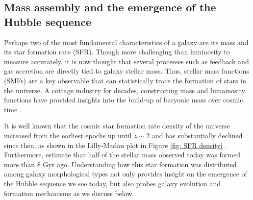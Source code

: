 \subsection{Mass assembly and the emergence of the Hubble sequence}
\label{chap1: mass assembly}

Perhaps two of the most fundamental characteristics of a galaxy are its mass and its star formation rate (SFR). Though more challenging than luminosity to measure accurately, it is now thought that several processes such as feedback \citep[e.g.,][]{Gabor2010} and gas accretion \citep[e.g.,][]{Conselice2013} are directly tied to galaxy stellar mass. Thus, stellar mass functions (SMFs) are a key observable that can statistically trace the formation of stars in the universe.  A cottage industry for decades, constructing mass and lumainosity functions have provided insights into the build-up of baryonic mass over cosmic time \citep{Steidel1999,Ouchi2004,Giavalisco2004,Drory2005,Fontana2006,Marchesini2009,Caputi2011,Gonzalez2011,Lee2012,Ilbert2013,Bernardi2013,Duncan2014}. 


It is well known that the cosmic star formation rate density of the universe increased from the earliest epochs up until $z\sim2$ and has substantially declined since then, as shown in the Lilly-Madau plot in Figure \ref{fig: SFR density} \citep[and references therein]{Madau2014}. Furthermore, \cite{Madau2014} estimate that half of the stellar mass observed today was formed more than 8 Gyr ago. Understanding how this star formation was distributed among galaxy morphological types not only provides insight on the emergence of the Hubble sequence we see today, but also probes galaxy evolution and formation mechanisms as we discuss below.

